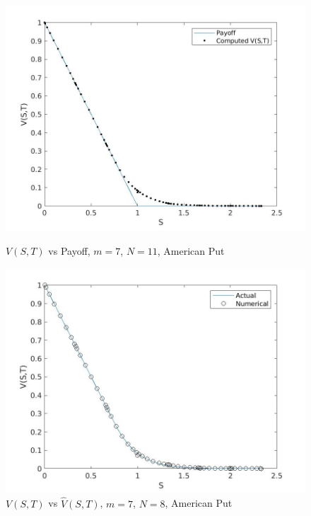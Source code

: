 \documentclass[a4paper,12pt]{article}
\begin{document}
\begin{figure}[p]
        \centering
        \includegraphics[width = \linewidth]{vst_a.jpg}
        \caption{$V(S,T)$ vs Payoff, $m=7$, $N=11$, American Put}
        \includegraphics[width = \linewidth]{a_vs.jpg}
        \caption{$V(S,T)$ vs $\hat{V}(S,T)$, $m=7$, $N=8$, American Put}
\end{figure}

\newpage
    
    
\end{document}
